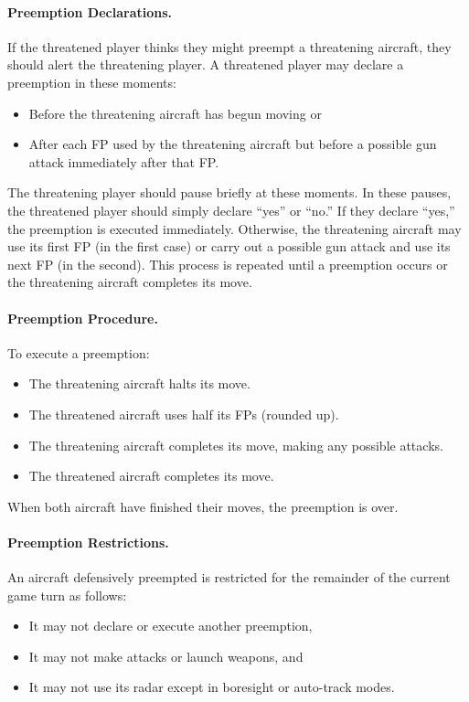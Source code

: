 {\paragraph{Preemption Declarations.}
If the threatened player thinks they might preempt a threatening aircraft, they should alert the threatening player. A threatened player may declare a preemption in these moments:
\begin{itemize}
    \item Before the threatening aircraft has begun moving or
    \item After each FP used by the threatening aircraft but before a possible gun attack immediately after that FP.
\end{itemize}
The threatening player should pause briefly at these moments. In these pauses, the threatened player should simply declare “yes” or “no.” If they declare “yes,” the preemption is executed immediately. Otherwise, the threatening aircraft may use its first FP (in the first case) or carry out a possible gun attack and use its next FP (in the second). This process is repeated until a preemption occurs or the threatening aircraft completes its move.

\paragraph{Preemption Procedure.} To execute a preemption:
\begin{itemize}
    \item The threatening aircraft halts its move.
    \item The threatened aircraft uses half its FPs (rounded up). 
    \item The threatening aircraft completes its move, making any possible attacks. 
    \item The threatened aircraft completes its move.
\end{itemize}
When both aircraft have finished their moves, the preemption is over.

\paragraph{Preemption Restrictions.} An aircraft defensively preempted is restricted for the remainder of the current game turn as follows:

\begin{itemize}
    \item It may not declare or execute another preemption,
    \item It may not make attacks or launch weapons, and
    \item It may not use its radar except in boresight or auto-track modes.
\end{itemize}	

}
